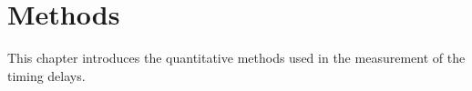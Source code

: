 \documentclass{kththesis}
\begin{document}


\frontmatter



\tableofcontents

\listoffigures
\listoftables

\clearpage
\printacronyms[%
  name = {Abbreviations},
  sort = false,
]

\mainmatter







\chapter{Methods}
This chapter introduces the quantitative methods used in the measurement of the timing delays. 
\end{document}
